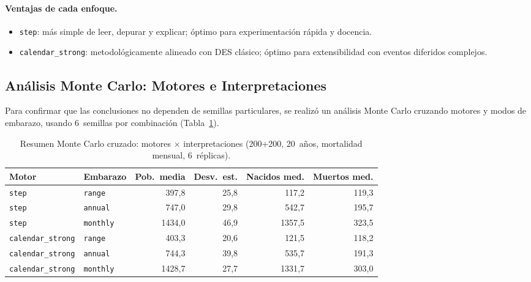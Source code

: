 \documentclass{llncs}
\begin{document}
\paragraph{Ventajas de cada enfoque.}
\begin{itemize}
  \item \texttt{step}: más simple de leer, depurar y explicar; óptimo para
        experimentación rápida y docencia.
  \item \texttt{calendar\_strong}: metodológicamente alineado con DES
        clásico; óptimo para extensibilidad con eventos diferidos complejos.
\end{itemize}

\subsection{Análisis Monte Carlo: Motores e Interpretaciones}
\label{sec:mc}

Para confirmar que las conclusiones no dependen de semillas particulares,
se realizó un análisis Monte Carlo cruzando motores y modos de embarazo,
usando 6~semillas por combinación (Tabla~\ref{tab:mc}).

\begin{table}[H]
\caption{Resumen Monte Carlo cruzado: motores $\times$ interpretaciones
         (200+200, 20~años, mortalidad mensual, 6~réplicas).}
\label{tab:mc}
\centering
\small
\begin{tabular}{llrrrr}
\toprule
\textbf{Motor} & \textbf{Embarazo} & \textbf{Pob.\ media} &
\textbf{Desv.\ est.} & \textbf{Nacidos med.} & \textbf{Muertos med.} \\
\midrule
\texttt{step}             & \texttt{range}   & 397{,}8 & 25{,}8 & 117{,}2 & 119{,}3 \\
\texttt{step}             & \texttt{annual}  & 747{,}0 & 29{,}8 & 542{,}7 & 195{,}7 \\
\texttt{step}             & \texttt{monthly} & 1434{,}0 & 46{,}9 & 1357{,}5 & 323{,}5 \\
\texttt{calendar\_strong} & \texttt{range}   & 403{,}3 & 20{,}6 & 121{,}5 & 118{,}2 \\
\texttt{calendar\_strong} & \texttt{annual}  & 744{,}3 & 39{,}8 & 535{,}7 & 191{,}3 \\
\texttt{calendar\_strong} & \texttt{monthly} & 1428{,}7 & 27{,}7 & 1331{,}7 & 303{,}0 \\
\bottomrule
\end{tabular}
\end{table}
\end{document}
